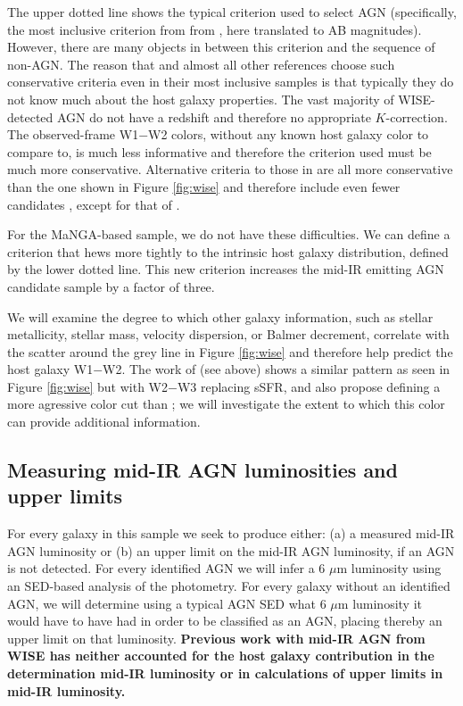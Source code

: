 \documentclass[12pt, preprint]{hacked-aastex}
\begin{document}
The upper dotted line shows the typical criterion used to select AGN
(specifically, the most inclusive criterion from from \cite{assef18a},
here translated to AB magnitudes). However, there are many objects in
between this criterion and the sequence of non-AGN. The reason that
\cite{assef18a} and almost all other references choose such conservative
criteria even in their most inclusive samples is that typically they
do not know much about the host galaxy properties.  The vast majority
of WISE-detected AGN do not have a redshift and therefore no
appropriate $K$-correction. The observed-frame W1$-$W2 colors, without
any known host galaxy color to compare to, is much less informative
and therefore the criterion used must be much more
conservative. Alternative criteria to those in \cite{assef18a} are
all more conservative than the one shown in Figure \ref{fig:wise} and
therefore include even fewer candidates \cite{jarrett11a,stern12a}, 
except for that of \cite{hviding22a}.

For the MaNGA-based sample, we do not have these 
difficulties. We can define a criterion that hews more tightly 
to the intrinsic host galaxy distribution, defined by the lower 
dotted line. This new criterion increases the mid-IR emitting AGN 
candidate sample by a factor of three.

We will examine the degree to which other galaxy information,
such as stellar metallicity, stellar mass, velocity dispersion,
or Balmer decrement, correlate with the scatter around the grey line in 
Figure \ref{fig:wise} and therefore help predict the host galaxy
W1$-$W2. The work of \cite{hviding22a} (see above) shows a similar
pattern as seen in Figure \ref{fig:wise} but with W2$-$W3 replacing
sSFR, and also propose defining a more agressive color cut than
\cite{assef18a}; we 
will investigate the extent to which this color can provide 
additional information.

\subsection{Measuring mid-IR AGN luminosities and upper limits}
\label{sec:measurements}

For every galaxy in this sample we seek to produce either:
(a) a measured mid-IR AGN luminosity or (b) an upper limit on the
mid-IR AGN  luminosity, if an AGN is not detected. For every 
identified AGN we will infer a 6 $\mu$m luminosity using an SED-based
analysis of the photometry. For every galaxy without an
identified AGN, we will determine using a typical AGN SED what 
6 $\mu$m luminosity it would have to have had in order to be 
classified as an AGN, placing thereby an upper
limit on that luminosity. {\bf Previous work with mid-IR 
AGN from WISE has neither accounted for the host galaxy
contribution in the determination mid-IR luminosity or 
in calculations of upper limits in mid-IR luminosity.}
\end{document}
